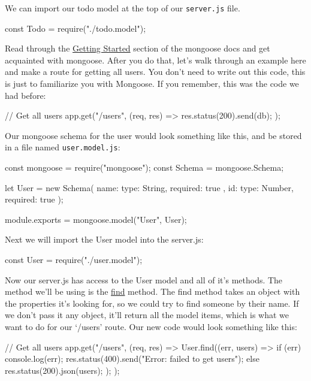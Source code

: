 \documentclass{42-en}
\begin{document}
    We can import our todo model at the top of our \texttt{server.js} file.
    \begin{42jscode}
        const Todo = require("./todo.model");
    \end{42jscode}
    
    \newpage
    
    Read through the \href{https://mongoosejs.com/docs/index.html}{Getting Started} section of the mongoose docs and get acquainted with mongoose.
After you do that, let's walk through an example here and make a route for getting all users. You don't need to write out this code, this is just to familiarize you with Mongoose.
If you remember, this was the code we had before:
    
\begin{42jscode}
        // Get all users
        app.get("/users", (req, res) => {
            res.status(200).send(db);
        });
\end{42jscode}

    Our mongoose schema for the user would look something like this, and be stored in a file named \texttt{user.model.js}:

	\begin{42jscode}
        const mongoose = require("mongoose");
        const Schema = mongoose.Schema;

        let User = new Schema({
            name: { type: String, required: true },
            id: { type: Number, required: true }
        });

        module.exports = mongoose.model("User", User);
    \end{42jscode}

    Next we will import the User model into the server.js:

    \begin{42jscode}
        const User = require("./user.model");
    \end{42jscode}

    Now our server.js has access to the User model and all of it’s methods. The method we’ll be using is the \href{https://mongoosejs.com/docs/api.html#model_Model.find}{find} method. The find method takes an object with the properties it’s looking for, so we could try to find someone by their name. If we don't pass it any object, it’ll return all the model items, which is what we want to do for our ‘/users’ route. Our new code would look something like this:

\begin{42jscode}
        // Get all users
        app.get("/users", (req, res) => {
            User.find((err, users) => {
                if (err) {
                console.log(err);
                res.status(400).send("Error: failed to get users");
                } else {
                res.status(200).json(users);
                }
            });
        });
\end{42jscode}
\end{document}
